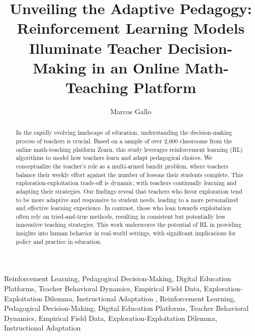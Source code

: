 \documentclass[
  number,
  preprint,
  3p,
  onecolumn]{elsarticle}
\begin{document}
\begin{frontmatter}
\title{Unveiling the Adaptive Pedagogy: Reinforcement Learning Models
Illuminate Teacher Decision-Making in an Online Math-Teaching Platform}
\author[]{Marcos Gallo%
%
}




        
\begin{abstract}
In the rapidly evolving landscape of education, understanding the
decision-making process of teachers is crucial. Based on a sample of
over 2,000 classrooms from the online math-teaching platform Zearn, this
study leverages reinforcement learning (RL) algorithms to model how
teachers learn and adapt pedagogical choices. We conceptualize the
teacher's role as a multi-armed bandit problem, where teachers balance
their weekly effort against the number of lessons their students
complete. This exploration-exploitation trade-off is dynamic, with
teachers continually learning and adapting their strategies. Our
findings reveal that teachers who favor exploration tend to be more
adaptive and responsive to student needs, leading to a more personalized
and effective learning experience. In contrast, those who lean towards
exploitation often rely on tried-and-true methods, resulting in
consistent but potentially less innovative teaching strategies. This
work underscores the potential of RL in providing insights into human
behavior in real-world settings, with significant implications for
policy and practice in education.
\end{abstract}





\begin{keyword}
    Reinforcement Learning, Pedagogical Decision-Making, Digital
Education Platforms, Teacher Behavioral Dynamics, Empirical Field Data,
Exploration-Exploitation Dilemma, Instructional Adaptation \sep 
    Reinforcement Learning, Pedagogical Decision-Making, Digital
Education Platforms, Teacher Behavioral Dynamics, Empirical Field Data,
Exploration-Exploitation Dilemma, Instructional Adaptation
\end{keyword}
\end{frontmatter}
    \ifdefined\Shaded\renewenvironment{Shaded}{\begin{tcolorbox}[interior hidden, enhanced, frame hidden, borderline west={3pt}{0pt}{shadecolor}, boxrule=0pt, breakable, sharp corners]}{\end{tcolorbox}}\fi
\end{document}
